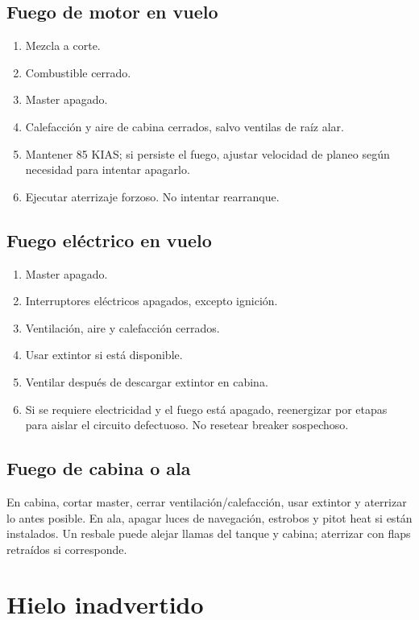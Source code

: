 \documentclass[11pt,oneside]{book}
\newenvironment{checklist}{\begin{enumerate}[label=\arabic*.]}{\end{enumerate}}
\begin{document}
\subsection{Fuego de motor en vuelo}
\begin{checklist}
\item Mezcla a corte.
\item Combustible cerrado.
\item Master apagado.
\item Calefacción y aire de cabina cerrados, salvo ventilas de raíz alar.
\item Mantener 85 KIAS; si persiste el fuego, ajustar velocidad de planeo según necesidad para intentar apagarlo.
\item Ejecutar aterrizaje forzoso. No intentar rearranque.
\end{checklist}

\subsection{Fuego eléctrico en vuelo}
\begin{checklist}
\item Master apagado.
\item Interruptores eléctricos apagados, excepto ignición.
\item Ventilación, aire y calefacción cerrados.
\item Usar extintor si está disponible.
\item Ventilar después de descargar extintor en cabina.
\item Si se requiere electricidad y el fuego está apagado, reenergizar por etapas para aislar el circuito defectuoso. No resetear breaker sospechoso.
\end{checklist}

\subsection{Fuego de cabina o ala}
En cabina, cortar master, cerrar ventilación/calefacción, usar extintor y aterrizar lo antes posible. En ala, apagar luces de navegación, estrobos y pitot heat si están instalados. Un resbale puede alejar llamas del tanque y cabina; aterrizar con flaps retraídos si corresponde.

\section{Hielo inadvertido}
\end{document}
